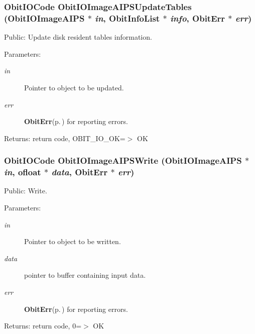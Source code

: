 \subsubsection{\setlength{\rightskip}{0pt plus 5cm}Obit\-IOCode Obit\-IOImage\-AIPSUpdate\-Tables ({\bf Obit\-IOImage\-AIPS} $\ast$ {\em in}, {\bf Obit\-Info\-List} $\ast$ {\em info}, {\bf Obit\-Err} $\ast$ {\em err})}\label{ObitIOImageAIPS_8h_a20}


Public: Update disk resident tables information. 

\begin{Desc}
\item[Parameters:]
\begin{description}
\item[{\em in}]Pointer to object to be updated. \item[{\em err}]{\bf Obit\-Err}{\rm (p.\,\pageref{structObitErr})} for reporting errors. \end{description}
\end{Desc}
\begin{Desc}
\item[Returns:]return code, OBIT\_\-IO\_\-OK=$>$ OK \end{Desc}
\subsubsection{\setlength{\rightskip}{0pt plus 5cm}Obit\-IOCode Obit\-IOImage\-AIPSWrite ({\bf Obit\-IOImage\-AIPS} $\ast$ {\em in}, {\bf ofloat} $\ast$ {\em data}, {\bf Obit\-Err} $\ast$ {\em err})}\label{ObitIOImageAIPS_8h_a14}


Public: Write. 

\begin{Desc}
\item[Parameters:]
\begin{description}
\item[{\em in}]Pointer to object to be written. \item[{\em data}]pointer to buffer containing input data. \item[{\em err}]{\bf Obit\-Err}{\rm (p.\,\pageref{structObitErr})} for reporting errors. \end{description}
\end{Desc}
\begin{Desc}
\item[Returns:]return code, 0=$>$ OK \end{Desc}
